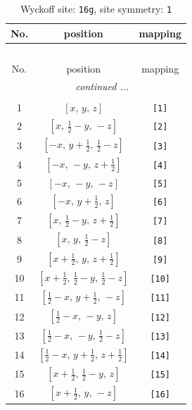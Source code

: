 \documentclass[fleqn,8pt]{jsarticle}
\begin{document}
\begin{longtable}{ccc}
\caption{Wyckoff site: {\tt 16g}, site symmetry: {\tt 1}}
 \\
 \hline \hline
No. & position & mapping \\ \hline \endfirsthead

\multicolumn{2}{l}{\tablename\ \thetable{}} \\
 \hline \hline
No. & position & mapping \\ \hline \endhead

 \hline \hline
\multicolumn{2}{r}{\footnotesize\it continued ...} \\ \endfoot

 \hline \hline
\multicolumn{2}{r}{} \\ \endlastfoot

1 & $\left[ x,\, y,\, z \right]$ & {\tt [1]} \\ \hline
2 & $\left[ x,\, \frac{1}{2} - y,\, - z \right]$ & {\tt [2]} \\ \hline
3 & $\left[ - x,\, y + \frac{1}{2},\, \frac{1}{2} - z \right]$ & {\tt [3]} \\ \hline
4 & $\left[ - x,\, - y,\, z + \frac{1}{2} \right]$ & {\tt [4]} \\ \hline
5 & $\left[ - x,\, - y,\, - z \right]$ & {\tt [5]} \\ \hline
6 & $\left[ - x,\, y + \frac{1}{2},\, z \right]$ & {\tt [6]} \\ \hline
7 & $\left[ x,\, \frac{1}{2} - y,\, z + \frac{1}{2} \right]$ & {\tt [7]} \\ \hline
8 & $\left[ x,\, y,\, \frac{1}{2} - z \right]$ & {\tt [8]} \\ \hline
9 & $\left[ x + \frac{1}{2},\, y,\, z + \frac{1}{2} \right]$ & {\tt [9]} \\ \hline
10 & $\left[ x + \frac{1}{2},\, \frac{1}{2} - y,\, \frac{1}{2} - z \right]$ & {\tt [10]} \\ \hline
11 & $\left[ \frac{1}{2} - x,\, y + \frac{1}{2},\, - z \right]$ & {\tt [11]} \\ \hline
12 & $\left[ \frac{1}{2} - x,\, - y,\, z \right]$ & {\tt [12]} \\ \hline
13 & $\left[ \frac{1}{2} - x,\, - y,\, \frac{1}{2} - z \right]$ & {\tt [13]} \\ \hline
14 & $\left[ \frac{1}{2} - x,\, y + \frac{1}{2},\, z + \frac{1}{2} \right]$ & {\tt [14]} \\ \hline
15 & $\left[ x + \frac{1}{2},\, \frac{1}{2} - y,\, z \right]$ & {\tt [15]} \\ \hline
16 & $\left[ x + \frac{1}{2},\, y,\, - z \right]$ & {\tt [16]} \\
\end{longtable}
\end{document}
